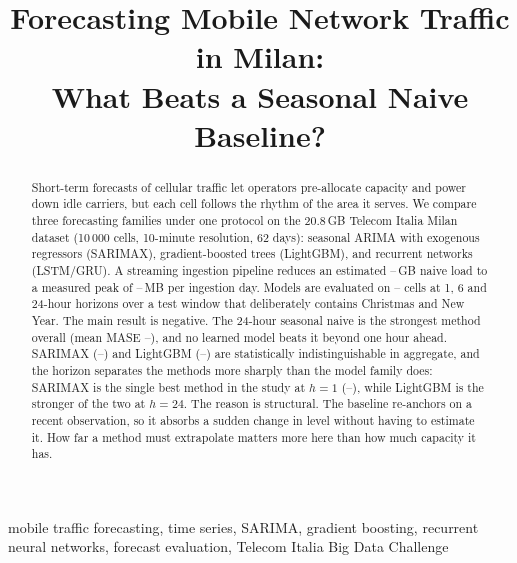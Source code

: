 \documentclass[conference,onecolumn,11pt]{IEEEtran}
\providecommand{\bestOverallMase}{--}
\providecommand{\nSelected}{--}
\providecommand{\naiveAllGB}{--}
\providecommand{\ingestPeakMB}{--}
\providecommand{\maseSarimaAll}{--}
\providecommand{\maseSarimaHOne}{--}
\providecommand{\maseLightgbmAll}{--}
\begin{document}
\raggedbottom

\title{Forecasting Mobile Network Traffic in Milan:\\ What Beats a Seasonal Naive Baseline?}

\author{
}

\maketitle

\begin{abstract}
Short-term forecasts of cellular traffic let operators pre-allocate capacity and power down idle carriers, but each cell follows the rhythm of the area it serves. We compare three forecasting families under one protocol on the 20.8\,GB Telecom Italia Milan dataset (10\,000 cells, 10-minute resolution, 62 days): seasonal ARIMA with exogenous regressors (SARIMAX), gradient-boosted trees (LightGBM), and recurrent networks (LSTM/GRU). A streaming ingestion pipeline reduces an estimated \naiveAllGB{}\,GB naive load to a measured peak of \ingestPeakMB{}\,MB per ingestion day. Models are evaluated on \nSelected{} cells at 1, 6 and 24-hour horizons over a test window that deliberately contains Christmas and New Year. The main result is negative. The 24-hour seasonal naive is the strongest method overall (mean MASE \bestOverallMase{}), and no learned model beats it beyond one hour ahead. SARIMAX (\maseSarimaAll{}) and LightGBM (\maseLightgbmAll{}) are statistically indistinguishable in aggregate, and the horizon separates the methods more sharply than the model family does: SARIMAX is the single best method in the study at $h{=}1$ (\maseSarimaHOne{}), while LightGBM is the stronger of the two at $h{=}24$. The reason is structural. The baseline re-anchors on a recent observation, so it absorbs a sudden change in level without having to estimate it. How far a method must extrapolate matters more here than how much capacity it has.
\end{abstract}

\begin{IEEEkeywords}
mobile traffic forecasting, time series, SARIMA, gradient boosting, recurrent neural networks, forecast evaluation, Telecom Italia Big Data Challenge
\end{IEEEkeywords}
\end{document}
